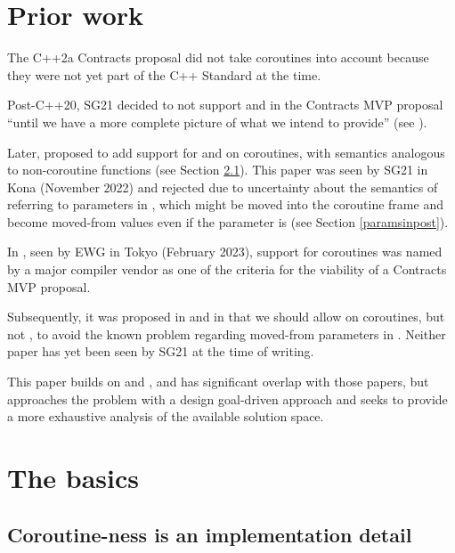 
\section{Prior work}

The C++2a Contracts proposal \cite{P0542R5} did not take coroutines into account because they were not yet part of the C++ Standard at the time.

Post-C++20, SG21 decided to not support  and  in the Contracts MVP proposal ``until we have a more complete picture of what we intend to provide'' (see \cite{P2932R3}).

Later, \cite{P2957R0} proposed to add support for  and  on coroutines, with semantics analogous to non-coroutine functions (see Section \ref{impldetail}). This paper was seen by SG21 in Kona (November 2022) and rejected due to uncertainty about the semantics of referring to parameters in , which might be moved into the coroutine frame and become moved-from values even if the parameter is  (see Section \ref{paramsinpost}).

In \cite{P3173R0}, seen by EWG in Tokyo (February 2023), support for coroutines was named by a major compiler vendor as one of the criteria for the viability of a Contracts MVP proposal.

Subsequently, it was proposed in \cite{P2957R1} and in \cite{P3251R0} that we should allow  on coroutines, but not , to avoid the known problem regarding moved-from parameters in . Neither paper has yet been seen by SG21 at the time of writing.

This paper builds on \cite{P2957R1} and \cite{P3251R0}, and has significant overlap with those papers, but approaches the problem with a design goal-driven approach and seeks to provide a more exhaustive analysis of the available solution space.

\section{The basics}

\subsection{Coroutine-ness is an implementation detail}
\label{impldetail}

